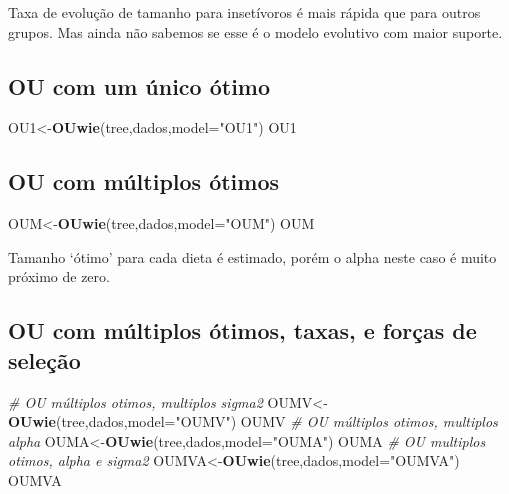 \documentclass[
]{book}
\newenvironment{Shaded}{\begin{snugshade}}{\end{snugshade}}
\newcommand{\AttributeTok}[1]{\textcolor[rgb]{0.13,0.29,0.53}{#1}}
\newcommand{\CommentTok}[1]{\textcolor[rgb]{0.56,0.35,0.01}{\textit{#1}}}
\newcommand{\FunctionTok}[1]{\textcolor[rgb]{0.13,0.29,0.53}{\textbf{#1}}}
\newcommand{\NormalTok}[1]{#1}
\newcommand{\OtherTok}[1]{\textcolor[rgb]{0.56,0.35,0.01}{#1}}
\newcommand{\StringTok}[1]{\textcolor[rgb]{0.31,0.60,0.02}{#1}}
\begin{document}
Taxa de evolução de tamanho para insetívoros é mais rápida que para outros grupos. Mas ainda não sabemos se esse é o modelo evolutivo com maior suporte.

\subsection{OU com um único ótimo}\label{ou-com-um-uxfanico-uxf3timo}

\begin{Shaded}
\begin{Highlighting}[]
\NormalTok{OU1}\OtherTok{\textless{}{-}}\FunctionTok{OUwie}\NormalTok{(tree,dados,}\AttributeTok{model=}\StringTok{"OU1"}\NormalTok{)}
\NormalTok{OU1}
\end{Highlighting}
\end{Shaded}

\subsection{OU com múltiplos ótimos}\label{ou-com-muxfaltiplos-uxf3timos}

\begin{Shaded}
\begin{Highlighting}[]
\NormalTok{OUM}\OtherTok{\textless{}{-}}\FunctionTok{OUwie}\NormalTok{(tree,dados,}\AttributeTok{model=}\StringTok{"OUM"}\NormalTok{)}
\NormalTok{OUM}
\end{Highlighting}
\end{Shaded}

Tamanho `ótimo' para cada dieta é estimado, porém o alpha neste caso é muito próximo de zero.

\subsection{OU com múltiplos ótimos, taxas, e forças de seleção}\label{ou-com-muxfaltiplos-uxf3timos-taxas-e-foruxe7as-de-seleuxe7uxe3o}

\begin{Shaded}
\begin{Highlighting}[]
\CommentTok{\# OU múltiplos otimos, multiplos sigma2}
\NormalTok{OUMV}\OtherTok{\textless{}{-}}\FunctionTok{OUwie}\NormalTok{(tree,dados,}\AttributeTok{model=}\StringTok{"OUMV"}\NormalTok{)}
\NormalTok{OUMV}
\CommentTok{\# OU múltiplos otimos, multiplos alpha}
\NormalTok{OUMA}\OtherTok{\textless{}{-}}\FunctionTok{OUwie}\NormalTok{(tree,dados,}\AttributeTok{model=}\StringTok{"OUMA"}\NormalTok{)}
\NormalTok{OUMA}
\CommentTok{\# OU multiplos otimos, alpha e sigma2}
\NormalTok{OUMVA}\OtherTok{\textless{}{-}}\FunctionTok{OUwie}\NormalTok{(tree,dados,}\AttributeTok{model=}\StringTok{"OUMVA"}\NormalTok{)}
\NormalTok{OUMVA}
\end{Highlighting}
\end{Shaded}
\end{document}
